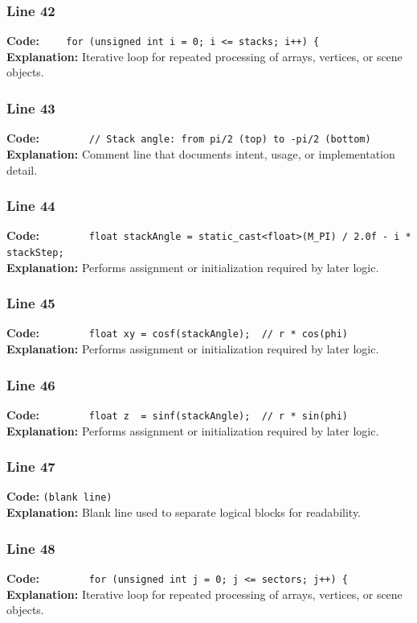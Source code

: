 \documentclass[11pt,a4paper]{article}
\begin{document}
\subsubsection*{Line 42}
\textbf{Code:} \verb|    for (unsigned int i = 0; i <= stacks; i++) {|\\
\textbf{Explanation:} Iterative loop for repeated processing of arrays, vertices, or scene objects.

\subsubsection*{Line 43}
\textbf{Code:} \verb|        // Stack angle: from pi/2 (top) to -pi/2 (bottom)|\\
\textbf{Explanation:} Comment line that documents intent, usage, or implementation detail.

\subsubsection*{Line 44}
\textbf{Code:} \verb|        float stackAngle = static_cast<float>(M_PI) / 2.0f - i * stackStep;|\\
\textbf{Explanation:} Performs assignment or initialization required by later logic.

\subsubsection*{Line 45}
\textbf{Code:} \verb|        float xy = cosf(stackAngle);  // r * cos(phi)|\\
\textbf{Explanation:} Performs assignment or initialization required by later logic.

\subsubsection*{Line 46}
\textbf{Code:} \verb|        float z  = sinf(stackAngle);  // r * sin(phi)|\\
\textbf{Explanation:} Performs assignment or initialization required by later logic.

\subsubsection*{Line 47}
\textbf{Code:} \texttt{(blank line)}\\
\textbf{Explanation:} Blank line used to separate logical blocks for readability.

\subsubsection*{Line 48}
\textbf{Code:} \verb|        for (unsigned int j = 0; j <= sectors; j++) {|\\
\textbf{Explanation:} Iterative loop for repeated processing of arrays, vertices, or scene objects.
\end{document}
